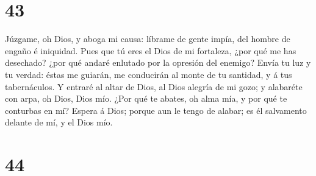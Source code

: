 \hypertarget{section-42}{%
\section{43}\label{section-42}}

 Júzgame, oh Dios, y aboga mi causa: líbrame de gente
impía, del hombre de engaño é iniquidad.  Pues que tú eres
el Dios de mi fortaleza, ¿por qué me has desechado? ¿por qué andaré
enlutado por la opresión del enemigo?  Envía tu luz y tu
verdad: éstas me guiarán, me conducirán al monte de tu santidad, y á tus
tabernáculos.  Y entraré al altar de Dios, al Dios alegría
de mi gozo; y alabaréte con arpa, oh Dios, Dios mío.  ¿Por
qué te abates, oh alma mía, y por qué te conturbas en mí? Espera á Dios;
porque aun le tengo de alabar; es él salvamento delante de mí, y el Dios
mío.

\hypertarget{section-43}{%
\section{44}\label{section-43}}


